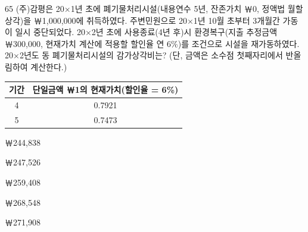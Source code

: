 \begin{question}{65}
(주)감평은 20×1년 초에 폐기물처리시설(내용연수 5년, 잔존가치 ￦0, 정액법 월할상각)을 ￦1,000,000에 취득하였다. 주변민원으로 20×1년 10월 초부터 3개월간 가동이 일시 중단되었다. 20×2년 초에 사용종료(4년 후)시 환경복구(지출 추정금액 ￦300,000, 현재가치 계산에 적용할 할인율 연 6\%)를 조건으로 시설을 재가동하였다. 20×2년도 동 폐기물처리시설의 감가상각비는? (단, 금액은 소수점 첫째자리에서 반올림하여 계산한다.)
\par{\small\centering\begin{tabular}{|c|c|}\hline
기간 & 단일금액 ￦1의 현재가치(할인율 = 6\%) \\ \hline
4 & 0.7921 \\ \hline
5 & 0.7473 \\ \hline
\end{tabular}\par}
\begin{choices}
  \item ￦244,838
  \item ￦247,526
  \item ￦259,408
  \item ￦268,548
  \item ￦271,908
\end{choices}
\end{question}
